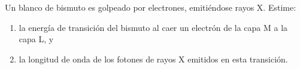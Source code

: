 \item Un blanco de bismuto es golpeado por electrones, emitiéndose rayos X. Estime:
\begin{enumerate}
    \item la energía de transición del bismuto al caer un electrón de la capa M a la capa L, y
    \item la longitud de onda de los fotones de rayos X emitidos en esta transición.
\end{enumerate}
